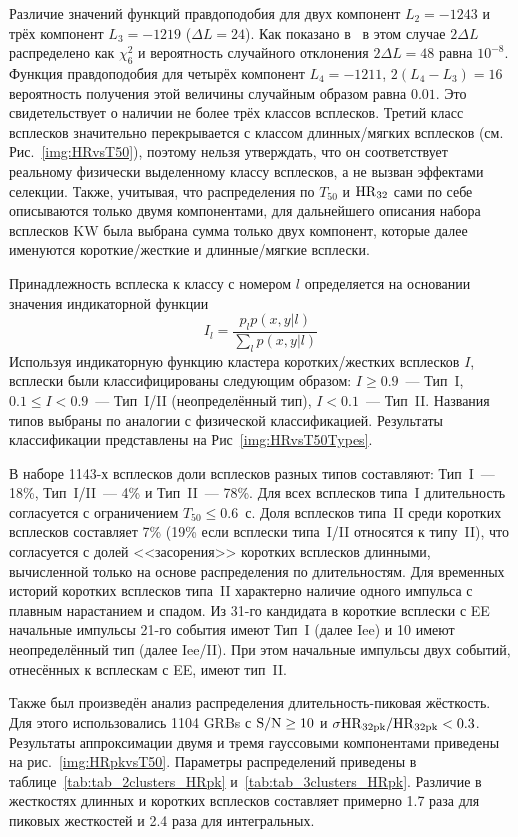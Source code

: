 Различие значений функций правдоподобия для двух компонент $L_2 = -1243$ и трёх 
компонент $L_3 = -1219$ ($\Delta L = 24$). Как показано в~\citep{Horvath_2006} 
в этом случае $2\Delta L$ распределено как $\chi^2_6$ и вероятность случайного 
отклонения $2\Delta L = 48$ равна $10^{-8}$. Функция правдоподобия для четырёх 
компонент $L_4 = -1211$, $2(L_4 - L_3) = 16$ вероятность получения этой величины случайным образом равна $0.01$. 
Это свидетельствует о наличии не более трёх классов всплесков. Третий класс всплесков 
значительно перекрывается с классом длинных/мягких всплесков (см. Рис.~\ref{img:HRvsT50}), поэтому нельзя утверждать, 
что он соответствует реальному физически выделенному классу всплесков, а не вызван эффектами селекции. 
Также, учитывая, что распределения по $T_{50}$ и ${\mathrm{HR}}_{32}$ сами по себе описываются 
только двумя компонентами, для дальнейшего описания набора всплесков KW была выбрана
сумма только двух компонент, которые далее именуются короткие/жесткие и длинные/мягкие всплески.

Принадлежность всплеска к классу с номером $l$ определяется на основании значения индикаторной функции
\begin{equation}
I_l =\frac{p_l p(x,y|l)}{\sum_l  p(x, y|l)}
\end{equation}
Используя индикаторную функцию кластера коротких/жестких всплесков $I$, 
всплески были классифицированы следующим образом: 
$I \geq 0.9$~--- Тип~I, $0.1 \leq I < 0.9$~--- Тип~I/II (неопределённый тип), 
$I < 0.1$~--- Тип~II. Названия типов выбраны по аналогии с физической классификацией. 
Результаты классификации представлены на Рис~\ref{img:HRvsT50Types}.

В наборе 1143-х всплесков доли всплесков разных типов составляют: Тип~I~--- 18\%,
Тип~I/II~--- 4\% и Тип~II~--- 78\%. Для всех всплесков типа~I длительность согласуется 
с ограничением $T_{50} \leq 0.6$~с. Доля всплесков типа~II среди коротких всплесков 
составляет 7\% (19\% если всплески типа~I/II относятся к типу~II), что согласуется с долей
<<засорения>> коротких всплесков длинными, вычисленной только на основе распределения 
по длительностям. Для временных историй коротких всплесков типа~II характерно 
наличие одного импульса с плавным нарастанием и спадом.
Из 31-го кандидата в короткие всплески с EE начальные импульсы 21-го события 
имеют Тип~I (далее Iee) и 10 имеют неопределённый тип (далее Iee/II).
При этом начальные импульсы двух событий, отнесённых к всплескам с EE, имеют тип~II.   %

Также был произведён анализ распределения длительность-пиковая жёсткость. 
Для этого использовались 1104 GRBs с ${\mathrm{S/N}} \geq 10$ и $\sigma {\mathrm{HR}}_{32{\mathrm{pk}}}/{\mathrm{HR}}_{32{\mathrm{pk}}} <0.3$. 
Результаты аппроксимации двумя и тремя гауссовыми компонентами приведены на рис.~\ref{img:HRpkvsT50}. 
Параметры распределений приведены в таблице~\ref{tab:tab_2clusters_HRpk} и~\ref{tab:tab_3clusters_HRpk}. 
Различие в жесткостях длинных и коротких всплесков составляет примерно 1.7 раза для пиковых 
жесткостей и 2.4 раза для интегральных. 

